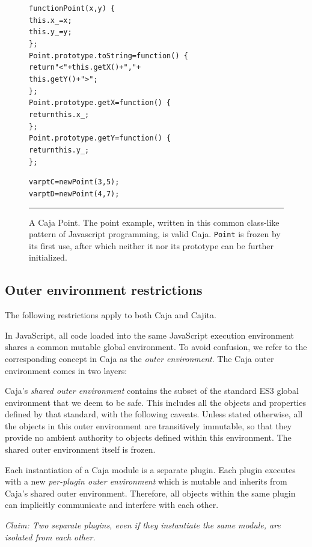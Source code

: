 \documentclass[letterpaper,twocolumn,10pt]{article}
\newcommand{\code}[1]{{\tt {#1}}}              %
\begin{document}
\begin{figure}[t!]
\begin{alltt}
function Point(x, y)\ \{
  this.x\_ = x;
  this.y\_ = y;
\};
Point.prototype.toString = function()\ \{ 
  return "<" + this.getX() + "," + 
               this.getY() + ">"; 
\};
Point.prototype.getX = function()\ \{ 
  return this.x\_; 
\};
Point.prototype.getY = function()\ \{ 
  return this.y\_; 
\};

var ptC = new Point(3, 5);
var ptD = new Point(4, 7);
\end{alltt}

\caption[A Caja Point.]{A Caja Point. The point example, written
in this common class-like pattern of Javascript programming, is valid Caja.
\code{Point} is frozen by its first use, after which neither it nor its
prototype can be further initialized. \\ } \hrule
\label{fig:caja-point}
\end{figure}


\subsection{Outer environment restrictions}

The following restrictions apply to both Caja and Cajita.

In JavaScript, all code loaded into the same JavaScript execution environment 
shares a common mutable global environment. To avoid confusion, we refer to 
the corresponding concept in Caja as the \emph{outer environment}. The Caja 
outer environment comes in two layers:

Caja's \emph{shared outer environment} contains the subset of the standard 
ES3 global environment that we deem to be safe. This includes all the objects 
and properties defined by that standard, with the following caveats. Unless 
stated otherwise, all the objects in this outer environment are transitively 
immutable, so that they provide no ambient authority to objects defined 
within this environment. The shared outer environment itself is frozen.

Each instantiation of a Caja module is a separate plugin. Each plugin 
executes with a new \emph{per-plugin outer environment} which is mutable and 
inherits from Caja's shared outer environment. Therefore, all objects within 
the same plugin can implicitly communicate and interfere with each other. 

\emph{Claim: Two separate plugins, even if they instantiate the same module, 
are isolated from each other.}
\end{document}
